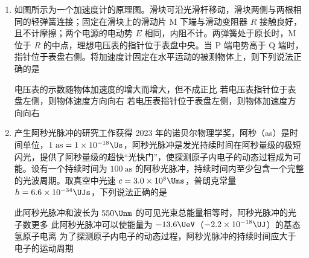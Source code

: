 \documentclass[\gkver]{gaokaozhenti}
\begin{document}
\begin{enumerate}
\item
如图所示为一个加速度计的原理图。滑块可沿光滑杆移动，滑块两侧与两根相同的轻弹簧连接；固定在滑块上的滑动片 M 下端与滑动变阻器 $R$ 接触良好，且不计摩擦；两个电源的电动势 $E$ 相同，内阻不计。两弹簧处于原长时，M 位于 $R$ 的中点，理想电压表的指针位于表盘中央。当 P 端电势高于 Q 端时，指针位于表盘右侧。将加速度计固定在水平运动的被测物体上，则下列说法正确的是


{电压表的示数随物体加速度的增大而增大，但不成正比}
{若电压表指针位于表盘左侧，则物体速度方向向右}
{若电压表指针位于表盘左侧，则物体加速度方向向右}


\item
产生阿秒光脉冲的研究工作获得 2023 年的诺贝尔物理学奖，阿秒（as）是时间单位，$1\ \mathrm{as} = 1\times10^{-18}\Us$，阿秒光脉冲是发光持续时间在阿秒量级的极短闪光，提供了阿秒量级的超快“光快门”，使探测原子内电子的动态过程成为可能。设有一个持续时间为 $100\ \mathrm{as}$ 的阿秒光脉冲，持续时间内至少包含一个完整的光波周期。取真空中光速 $c = 3.0\times10^{8}\Ums$，普朗克常量 $h = 6.6\times10^{-34}\UJs$，下列说法正确的是

{此阿秒光脉冲和波长为 $550\Unm$ 的可见光束总能量相等时，阿秒光脉冲的光子数更多}
{此阿秒光脉冲可以使能量为 $-13.6\UeV$（$-2.2\times10^{-18}\UJ$）的基态氢原子电离}
{为了探测原子内电子的动态过程，阿秒光脉冲的持续时间应大于电子的运动周期}


\end{enumerate}
\end{document}
